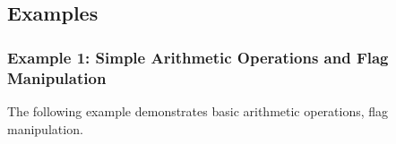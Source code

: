 \subsection{Examples}
\subsubsection{Example 1: Simple Arithmetic Operations and Flag Manipulation}
The following example demonstrates basic arithmetic operations, flag manipulation.

